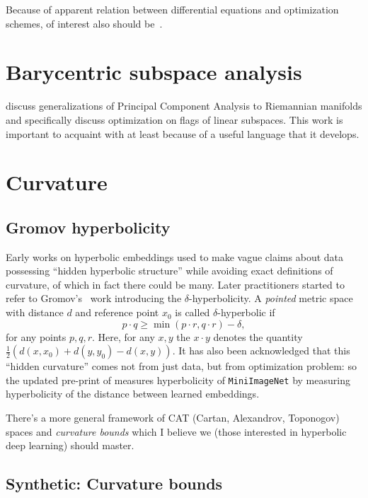 Because of apparent relation between differential equations and optimization
schemes, of interest also should
be~\citet{ambrosioGradientFlows,ambrosioOTSummerSchool}.

\section*{Barycentric subspace analysis}

\citet{baryPennec} discuss generalizations of Principal Component Analysis to
Riemannian manifolds and specifically discuss optimization on flags of linear
subspaces. This work is important to acquaint with at least because of a useful
language that it develops.
\section{Curvature} \label{sec:curvature}

\subsection*{Gromov hyperbolicity}

Early works on hyperbolic embeddings used to make vague claims about data
possessing ``hidden hyperbolic structure'' while avoiding exact definitions of
curvature, of which in fact there could be many. Later practitioners started
to refer to Gromov's~\cite{gromov} work introducing the \( \delta
\)-hyperbolicity. A \emph{pointed} metric space with distance \( d \) and reference point \( x_0 \) is called \( \delta \)-hyperbolic if
\[ p\cdot q \geq \min(p\cdot r, q\cdot r) - \delta, \]
for any points \( p, q, r \).
Here, for any \(x, y \) the \( x\cdot y \)
denotes the quantity \( \frac12 (d(x, x_0) + d(y, y_0) - d(x, y)) \).
It has also been acknowledged that this ``hidden curvature'' comes not from
just data, but from optimization problem: so the updated pre-print of
\citet{khrulkov} measures hyperbolicity of \texttt{MiniImageNet} by measuring
hyperbolicity of the distance between learned embeddings.

There's a more general framework of CAT (Cartan, Alexandrov, Toponogov) spaces
and \emph{curvature bounds} which I believe we (those interested in hyperbolic
deep learning) should master.

\subsection*{Synthetic: Curvature bounds}

